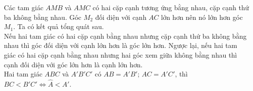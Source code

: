 \begin{vd}
{\begin{enumerate}
	\end{enumerate}
	\begin{note}
		Các tam giác $AMB$ và $AMC$ có hai cặp cạnh tương ứng bằng nhau, cặp cạnh thứ ba không bằng nhau. Góc $M_2$ đối diện với cạnh $AC$ lớn hơn nên nó lớn hơn góc $M_1$. Ta có kết quả tổng quát sau.\\
		Nếu hai tam giác có hai cặp cạnh bằng nhau nhưng cặp cạnh thứ ba không bằng nhau thì góc đối diện với cạnh lớn hơn là góc lớn hơn. Ngược lại, nếu hai tam giác có hai cặp cạnh bằng nhau nhưng hai góc xem giữa không bằng nhau thì cạnh đối diện với góc lớn hơn là cạnh lớn hơn.\\
		Hai tam giác $ABC$ và $A'B'C'$ có $AB=A'B'$; $AC=A'C'$, thì $BC<B'C'\Leftrightarrow \widehat{A}<\widehat{A'}$.
	\end{note}
	}
\end{vd}

